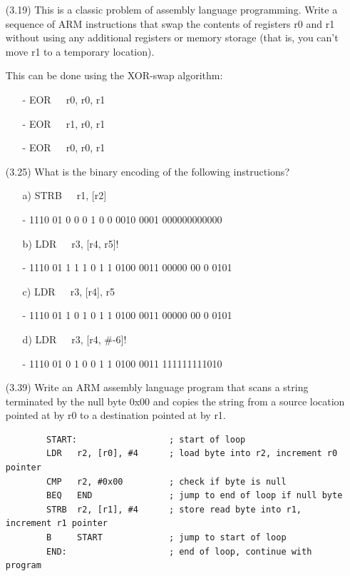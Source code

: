 \documentclass[letterpaper,10pt,titlepage]{article}
\begin{document}
\begin{enumerate}
	\item[(3.19)] This is a classic problem of assembly language programming. Write a
		sequence of ARM instructions that swap the contents of registers r0 and r1
		without using any additional registers or memory storage (that is, you
		can't move r1 to a temporary location).
	\item[\textbullet] This can be done using the XOR-swap algorithm:
		\begin{enumerate}
			\item[-] EOR\ \ \ r0, r0, r1
			\item[-] EOR\ \ \ r1, r0, r1
			\item[-] EOR\ \ \ r0, r0, r1
		\end{enumerate}
	\item[(3.25)] What is the binary encoding of the following instructions?
		\begin{enumerate}
			\item[a)] STRB\ \ \ r1, [r2]
			\item[-] 1110 01 0 0 0 1 0 0 0010 0001 000000000000
			\item[b)] LDR\ \ \ r3, [r4, r5]!
			\item[-] 1110 01 1 1 1 0 1 1 0100 0011 00000 00 0 0101
			\item[c)] LDR\ \ \ r3, [r4], r5
			\item[-] 1110 01 1 0 1 0 1 1 0100 0011 00000 00 0 0101
			\item[d)] LDR\ \ \ r3, [r4, \#-6]!
			\item[-] 1110 01 0 1 0 0 1 1 0100 0011 111111111010
		\end{enumerate}

	\item[(3.39)] Write an ARM assembly language program that scans a string
		terminated by the null byte 0x00 and copies the string from a source
		location pointed at by r0 to a destination pointed at by r1.
		\\
		\begin{verbatim}
		START:                  ; start of loop
		LDR   r2, [r0], #4      ; load byte into r2, increment r0 pointer
		CMP   r2, #0x00         ; check if byte is null
		BEQ   END               ; jump to end of loop if null byte
		STRB  r2, [r1], #4      ; store read byte into r1, increment r1 pointer
		B     START             ; jump to start of loop
		END:                    ; end of loop, continue with program
		\end{verbatim}


\end{enumerate}
\end{document}
